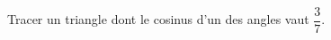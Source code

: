 
\begin{exercice}\label{exo2smath-0146}

    Tracer un triangle dont le cosinus d'un des angles vaut \( \dfrac{ 3 }{ 7 }\).

\end{exercice}
